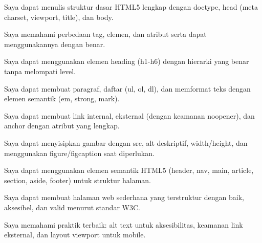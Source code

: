 \documentclass[../main.tex]{subfiles}
\begin{document}
\begin{checklist}
  \item Saya dapat menulis struktur dasar HTML5 lengkap dengan doctype, head (meta charset, viewport, title), dan body.
  \item Saya memahami perbedaan tag, elemen, dan atribut serta dapat menggunakannya dengan benar.
  \item Saya dapat menggunakan elemen heading (h1-h6) dengan hierarki yang benar tanpa melompati level.
  \item Saya dapat membuat paragraf, daftar (ul, ol, dl), dan memformat teks dengan elemen semantik (em, strong, mark).
  \item Saya dapat membuat link internal, eksternal (dengan keamanan noopener), dan anchor dengan atribut yang lengkap.
  \item Saya dapat menyisipkan gambar dengan src, alt deskriptif, width/height, dan menggunakan figure/figcaption saat diperlukan.
  \item Saya dapat menggunakan elemen semantik HTML5 (header, nav, main, article, section, aside, footer) untuk struktur halaman.
  \item Saya dapat membuat halaman web sederhana yang terstruktur dengan baik, aksesibel, dan valid menurut standar W3C.
  \item Saya memahami praktik terbaik: alt text untuk aksesibilitas, keamanan link eksternal, dan layout viewport untuk mobile.
\end{checklist}
\end{document}

